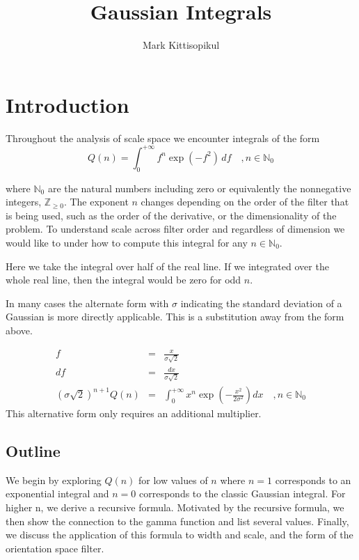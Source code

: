 \documentclass{article}
\title{Gaussian Integrals}
\author{Mark Kittisopikul}
\begin{document}
\maketitle

\section{Introduction}
Throughout the analysis of scale space we encounter integrals of the form
\begin{equation}
	Q(n) = \int_0^{+\infty} f^n \exp(-f^2) \, df \quad, n \in \mathbb{N}_0
\end{equation}

where $ \mathbb{N}_0 $ are the natural numbers including zero or equivalently the nonnegative integers, $ \mathbb{Z}_{\geq 0} $. The exponent $ n $ changes depending on the order of the filter that is being used, such as the order of the derivative, or the dimensionality of the problem. To understand scale across filter order and regardless of dimension we would like to under how to compute this integral for any $ n \in \mathbb{N}_0 $.

Here we take the integral over half of the real line. If we integrated over the whole real line, then the integral would be zero for odd $ n $.

In many cases the alternate form with $ \sigma $ indicating the standard deviation of a Gaussian is more directly applicable. This is a substitution away from the form above.

\begin{eqnarray}
	f & = &  \frac{x}{\sigma \sqrt{2}} \\
	df & = & \frac{dx}{\sigma \sqrt{2}} \\
	(\sigma \sqrt{2})^{n+1}
	Q\left( n \right) 
	& = & 
	 \int_0^{+\infty} x^n
	  \exp\left(
		  -\frac{x^2}{2\sigma^2}
	  \right) dx \quad, n \in \mathbb{N}_0
\end{eqnarray}
This alternative form only requires an additional multiplier.

\subsection{Outline}
We begin by exploring $ Q(n) $ for low values of $ n $ where $ n = 1 $ corresponds to an exponential integral and $ n = 0$ corresponds to the classic Gaussian integral. For higher n, we derive a recursive formula. Motivated by the recursive formula, we then show the connection to the gamma function and list several values. Finally, we discuss the application of this formula to width and scale, and the form of the orientation space filter.
\end{document}
